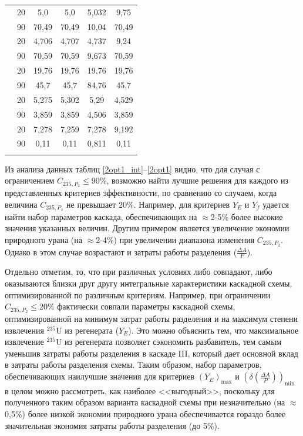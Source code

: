 \begin{table}[ht]
\begin{tabular}{|r|r||c|c|c|c|}
            & 20 & 5,0 & 5,0 & 5,032 & 9,75 \\\cline{2-6} 
            & 90 & 70,49 & 70,49 & 10,04 & 70,49\\
        \Xhline{2\arrayrulewidth}
        \multirow{2}{*}{$C_{235,W_{2}}, \%$}
            & 20 & 4,706 & 4,707 & 4,737 & 9,24 \\\cline{2-6} 
            & 90 & 70,59 & 70,59 & 9,673 & 70,59\\
    \Xhline{2\arrayrulewidth}
        \multirow{2}{*}{$C_{235,P_{2}}, \%$}
            & 20 & 19,76 & 19,76 & 19,76 & 19,76 \\\cline{2-6} 
            & 90 & 45,7 & 45,7 & 84,76 & 45,7\\
        \Xhline{2\arrayrulewidth}
        \multirow{2}{*}{$C_{235,P_{n}}, \%$}
            & 20 & 5,275 & 5,302 & 5,29 & 4,529 \\\cline{2-6} 
            & 90 & 3,859 & 3,859 & 4,506 & 3,859\\
        \Xhline{2\arrayrulewidth}           
        \multirow{2}{*}{$P_2$, кг}
            & 20 & 7,278 & 7,259 & 7,278 & 9,192 \\\cline{2-6} 
            & 90 & 0,11 & 0,11 & 0,811 & 0,11\\
\Xhline{2\arrayrulewidth}
        \end{tabular}
\end{table}

Из анализа данных таблиц \ref{2opt1_int}--\ref{2opt1} видно, что для случая с ограничением $C_{235,{P_2}} \leq 90\%$, возможно найти лучшие решения для каждого из представленных критериев эффективности, по сравнению со случаем, когда величина $C_{235,{P_2}}$ не превышает 20\%. Например, для критериев $Y_E$ и $Y_f$ удается найти набор параметров каскада, обеспечивающих на $\approx$2-5\% более высокие значения указанных величин. Другим примером является увеличение экономии природного урана (на $\approx$2-4\%) при увеличении диапазона изменения $C_{235,{P_2}}$. Однако в этом случае возрастают и затраты работы разделения ($\frac{\Delta A}{P}$).

Отдельно отметим, то, что при различных условиях либо совпадают, либо оказываются близки друг другу интегральные характеристики каскадной схемы, оптимизированной по различным критериям. Например, при ограничении $C_{235,{P_2}} \leq 20\%$ фактически совпали параметры каскадной схемы, оптимизированной на минимум затрат работы разделения и на максимум степени извлечения $^{235}$U из регенерата ($Y_E$). Это можно объяснить тем, что максимальное извлечение $^{235}$U из регенерата позволяет сэкономить разбавитель, тем самым уменьшив затраты работы разделения в каскаде III, который дает основной вклад в затраты работы разделения схемы. Таким образом, набор параметров, обеспечивающих наилучшие значения для критериев $(Y_{E})_\text{max}$ и $(\delta(\frac{\Delta A}{P}))_\text{min}$ в целом можно рассмотреть, как наиболее <<выгодный>>, поскольку для полученного таким образом варианта каскадной схемы при незначительно (на $\approx$0,5\%) более низкой экономии природного урана обеспечивается гораздо более значительная экономия затраты работы разделения (до 5\%). 


